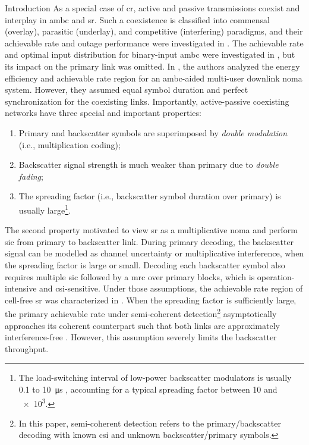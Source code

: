 \documentclass[journal]{IEEEtran}
\begin{document}
\begin{section}{Introduction}
	As a special case of \gls{cr}, active and passive transmissions coexist and interplay in \gls{ambc} and \gls{sr}.
	Such a coexistence is classified into commensal (overlay), parasitic (underlay), and competitive (interfering) paradigms, and their achievable rate and outage performance were investigated in \cite{Guo2019b,Ding2020}.
	The achievable rate and optimal input distribution for binary-input \gls{ambc} were investigated in \cite{Qian2019b}, but its impact on the primary link was omitted.
	In \cite{Hassani2023}, the authors analyzed the energy efficiency and achievable rate region for an \gls{ambc}-aided multi-user downlink \gls{noma} system.
	However, they assumed equal symbol duration and perfect synchronization for the coexisting links.
	Importantly, active-passive coexisting networks have three special and important properties:
	\begin{enumerate}
		\item Primary and backscatter symbols are superimposed by \emph{double modulation} (i.e., multiplication coding);
		\item Backscatter signal strength is much weaker than primary due to \emph{double fading};
		\item The spreading factor (i.e., backscatter symbol duration over primary) is usually large\footnote{The load-switching interval of low-power backscatter modulators is usually \num{0.1} to \qty{10}{\us} \cite{Torres2021}, accounting for a typical spreading factor between \num{10} and \num{e3}.}.
	\end{enumerate}
	The second property motivated \cite{Long2020a,Liang2020,Guo2019b,Ding2020,Hassani2023,Zhou2019a,Wu2021a,Xu2021a,Yang2021a,Yang2018,Han2021,Zhang2022,Dai2023} to view \gls{sr} as a multiplicative \gls{noma} and perform \gls{sic} from primary to backscatter link.
	During primary decoding, the backscatter signal can be modelled as channel uncertainty or multiplicative interference, when the spreading factor is large or small.
	Decoding each backscatter symbol also requires multiple \gls{sic} followed by a \gls{mrc} over primary blocks, which is operation-intensive and \gls{csi}-sensitive.
	Under those assumptions, the achievable rate region of cell-free \gls{sr} was characterized in \cite{Dai2023}.
	When the spreading factor is sufficiently large, the primary achievable rate under semi-coherent detection\footnote{In this paper, semi-coherent detection refers to the primary/backscatter decoding with known \gls{csi} and unknown backscatter/primary symbols.} asymptotically approaches its coherent counterpart such that both links are approximately interference-free \cite{Long2020a}.
	However, this assumption severely limits the backscatter throughput.


\end{section}
\end{document}
